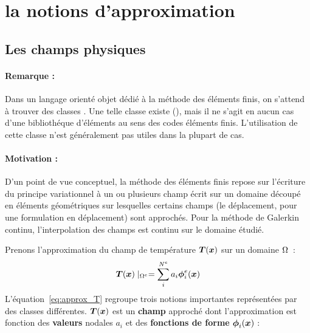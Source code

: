 \clearpage
\section{la notions d'approximation}

\subsection{Les champs physiques}

\paragraph*{Remarque :}
Dans un langage orient\'e objet d\'edi\'e \`a la m\'ethode des  \'el\'ements
finis, on s'attend \`a trouver des classes . Une
telle classe existe (), mais il ne s'agit en
aucun cas d'une biblioth\'eque d'\'el\'ements au sens des codes \'el\'ements
finis. L'utilisation de cette classe n'est g\'en\'eralement pas utiles
dans la plupart de cas.

\paragraph*{Motivation :}
D'un point de vue conceptuel, la m\'ethode des \'el\'ements finis repose
sur l'\'ecriture du principe variationnel \`a un ou plusieurs champ
\'ecrit sur un domaine d\'ecoup\'e en \'el\'ements g\'eom\'etriques sur lesquelles
certains champs (le d\'eplacement, pour une formulation en
d\'eplacement) sont  approch\'es. Pour la m\'ethode de Galerkin continu,
l'interpolation des champs est continu sur le domaine \'etudi\'e.

Prenons l'approximation du champ de temp\'erature $\mbox{\boldmath $T$}(\mbox{\boldmath $x$})$ sur un
domaine ${\Omega}$~:
\begin{equation}
  \label{eq:approx_T}
  \mbox{\boldmath $T$}(\mbox{\boldmath $x$}) \mid_{{\Omega}^{e}} = \sum_{i}^{N^{e}}  a_i
  \mbox{\boldmath $\phi$}_i^{e}(\mbox{\boldmath $x$})
\end{equation}
L'\'equation~\ref{eq:approx_T} regroupe trois notions importantes
repr\'esent\'ees par des classes diff\'erentes. $\mbox{\boldmath $T$}(\mbox{\boldmath $x$})$ est un
\textbf{champ} approch\'e   dont l'approximation est fonction des
\textbf{valeurs} nodales $a_i$ et des \textbf{fonctions de forme}
$\mbox{\boldmath $\phi$}_i(\mbox{\boldmath $x$})$ :

